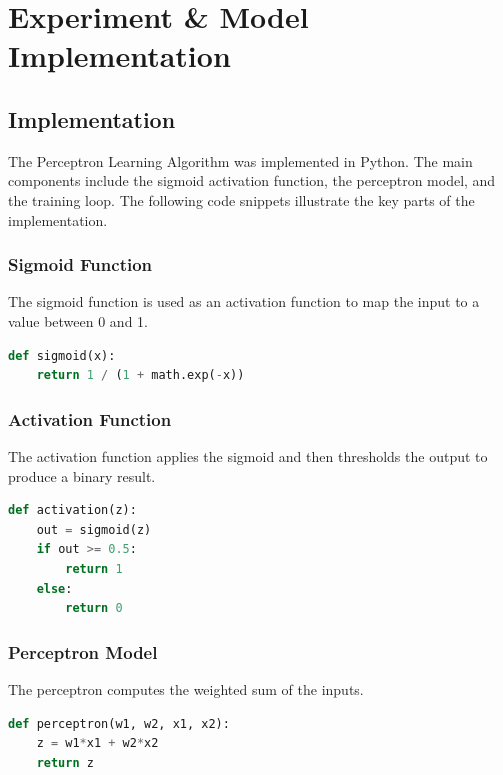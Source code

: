 \documentclass[a4paper, journal]{IEEEtran}
\begin{document}
\section*{Experiment \& Model Implementation}
\subsection*{Implementation}
The Perceptron Learning Algorithm was implemented in Python. The main components include the sigmoid activation function, the perceptron model, and the training loop. The following code snippets illustrate the key parts of the implementation.

\subsubsection*{Sigmoid Function}
The sigmoid function is used as an activation function to map the input to a value between 0 and 1.
\begin{lstlisting}[language=Python, caption=Sigmoid Function]
def sigmoid(x):
    return 1 / (1 + math.exp(-x))
\end{lstlisting}

\subsubsection*{Activation Function}
The activation function applies the sigmoid and then thresholds the output to produce a binary result.
\begin{lstlisting}[language=Python, caption=Activation Function]
def activation(z):
    out = sigmoid(z)
    if out >= 0.5:
        return 1
    else:
        return 0
\end{lstlisting}

\subsubsection*{Perceptron Model}
The perceptron computes the weighted sum of the inputs.
\begin{lstlisting}[language=Python, caption=Perceptron Model]
def perceptron(w1, w2, x1, x2):
    z = w1*x1 + w2*x2
    return z
\end{lstlisting}
\end{document}
